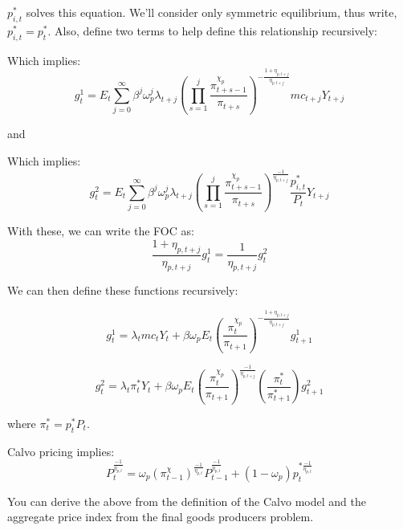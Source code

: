 \documentclass[article,11pt,letterpaper,fleqn]{article}
\theoremstyle{definition}
\numberwithin{equation}{section}
\begin{document}
$p^{*}_{i,t}$ solves this equation.  We'll consider only symmetric equilibrium, thus write, $p^{*}_{i,t}=p^{*}_{t}$.  Also, define two terms to help define this relationship recursively:

Which implies:
\begin{equation}
g^{1}_{t}= E_{t}\sum_{j=0}^{\infty} \beta^{j}\omega^{j}_{p}\lambda_{t+j}\left(\prod_{s=1}^{j}\frac{\pi^{\chi_{p}}_{t+s-1}}{\pi_{t+s}}\right)^{-\frac{1+\eta_{p,t+j}}{\eta_{p,t+j}}}mc_{t+j}Y_{t+j}
\end{equation}

and

Which implies:
\begin{equation}
g^{2}_{t}= E_{t}\sum_{j=0}^{\infty} \beta^{j}\omega^{j}_{p}\lambda_{t+j}\left(\prod_{s=1}^{j}\frac{\pi^{\chi_{p}}_{t+s-1}}{\pi_{t+s}}\right)^{\frac{-1}{\eta_{p,t+j}}}\frac{p^{*}_{i,t}}{P_{t}}Y_{t+j}
\end{equation}

With these, we can write the FOC as: 
\begin{equation}
\label{price_rule}
\frac{1+\eta_{p,t+j}}{\eta_{p,t+j}}g^{1}_{t}={\frac{1}{\eta_{p,t+j}}}g^{2}_{t}
\end{equation}

We can then define these functions recursively:

\begin{equation}
\label{g1}
g^{1}_{t}= \lambda_{t}mc_{t}Y_{t} + \beta\omega_{p}E_{t}\left(\frac{\pi^{\chi_{p}}_{t}}{\pi_{t+1}}\right)^{-\frac{1+\eta_{p,t+j}}{\eta_{p,t+j}}}g^{1}_{t+1}
\end{equation}

\begin{equation}
\label{g2}
g^{2}_{t}= \lambda_{t}\pi^{*}_{t}Y_{t} + \beta\omega_{p}E_{t}\left(\frac{\pi^{\chi_{p}}_{t}}{\pi_{t+1}}\right)^{\frac{-1}{\eta_{p,t+j}}}\left(\frac{\pi^{*}_{t}}{\pi^{*}_{t+1}}\right)g^{2}_{t+1}
\end{equation}

where $\pi^{*}_{t}={p^{*}_{t}}{P_{t}}$.


Calvo pricing implies:
\begin{equation}
\label{Calvo_price}
P_{t}^{\frac{-1}{\eta_{p,t}}}= \omega_{p}\left(\pi^{\chi}_{t-1}\right)^{\frac{-1}{\eta_{p,t}}} P_{t-1}^{\frac{-1}{\eta_{p,t}}} +(1-\omega_{p})p_{t}^{*\frac{-1}{\eta_{p,t}}}
\end{equation}

 You can derive the above from the definition of the Calvo model and the aggregate price index from the final goods producers problem.  
\end{document}

